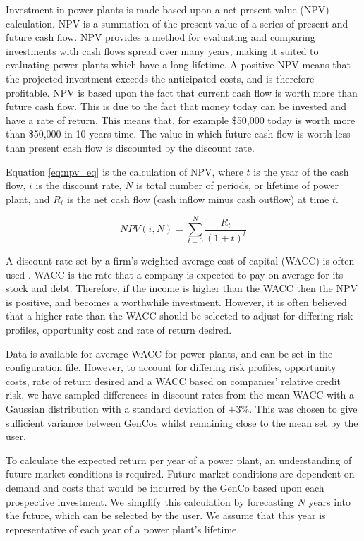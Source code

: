 Investment in power plants is made based upon a net present value (NPV) calculation. NPV is a summation of the present value of a series of present and future cash flow. NPV provides a method for evaluating and comparing investments with cash flows spread over many years, making it suited to evaluating power plants which have a long lifetime. A positive NPV means that the projected investment exceeds the anticipated costs, and is therefore profitable. NPV is based upon the fact that current cash flow is worth more than future cash flow. This is due to the fact that money today can be invested and have a rate of return. This means that, for example \$50,000 today is worth more than \$50,000 in 10 years time. The value in which future cash flow is worth less than present cash flow is discounted by the discount rate.

Equation \ref{eq:npv_eq} is the calculation of NPV, where $t$ is the year of the cash flow, $i$ is the discount rate, $N$ is total number of periods, or lifetime of power plant, and $R_t$ is the net cash flow (cash inflow minus cash outflow) at time $t$.

\begin{equation} \label{eq:npv_eq}
NPV(i, N) = \sum_{t=0}^{N}\frac{R_t}{(1+t)^t}
\end{equation}

A discount rate set by a firm's weighted average cost of capital (WACC) is often used \cite{KincheloeStephenC1990TWAC}. WACC is the rate that a company is expected to pay on average for its stock and debt. Therefore, if the income is higher than the WACC then the NPV is positive, and becomes a worthwhile investment. However, it is often believed that a higher rate than the WACC should be selected to adjust for differing risk profiles, opportunity cost and rate of return desired.

Data is available for average WACC for power plants, and can be set in the configuration file. However, to account for differing risk profiles, opportunity costs, rate of return desired and a WACC based on companies' relative credit risk, we have sampled differences in discount rates from the mean WACC with a Gaussian distribution with a standard deviation of $\pm3\%$. This was chosen to give sufficient variance between GenCos whilst remaining close to the mean set by the user.

To calculate the expected return per year of a power plant, an understanding of future market conditions is required. Future market conditions are dependent on demand and costs that would be incurred by the GenCo based upon each prospective investment. We simplify this calculation by forecasting $N$ years into the future, which can be selected by the user. We assume that this year is representative of each year of a power plant's lifetime.

